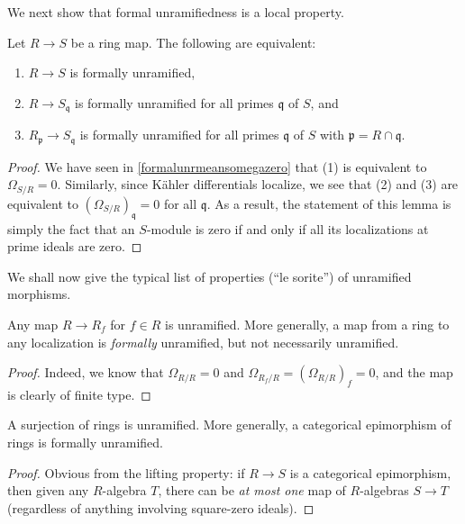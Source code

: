 We next show that formal unramifiedness is a local property.
\begin{lemma}
\label{lemma-formally-unramified-local}
Let $R \to S$ be a ring map.
The following are equivalent:
\begin{enumerate}
\item $R \to S$ is formally unramified,
\item $R \to S_{\mathfrak q}$ is formally unramified for all
primes $\mathfrak q$ of $S$, and
\item $R_{\mathfrak p} \to S_{\mathfrak q}$ is formally unramified
for all primes $\mathfrak q$ of $S$ with $\mathfrak p = R \cap \mathfrak q$.
\end{enumerate}
\end{lemma}

\begin{proof}
We have seen in
\cref{formalunrmeansomegazero}
that (1) is equivalent to
$\Omega_{S/R} = 0$. Similarly, since K\"ahler differentials localize, we see that (2) and (3)
are equivalent to $(\Omega_{S/R})_{\mathfrak q} = 0$ for all
$\mathfrak q$. 
As a result, the statement of this lemma is simply the fact that an $S$-module
is zero if and only if all its localizations at prime ideals are zero. 
\end{proof}

We shall now give the typical list of properties (``le sorite'') of unramified morphisms.

\begin{proposition} \label{locunramified}
Any map $R \to R_f$ for $f \in  R$ is unramified.
More generally, a map from a ring to any localization is \emph{formally}
unramified, but not necessarily unramified. 
\end{proposition} 
\begin{proof} 
Indeed, we know that $\Omega_{R/R}  = 0$ and $\Omega_{R_f/R } =
(\Omega_{R/R})_f=0$, and the map is clearly of finite type.
\end{proof} 

\begin{proposition} \label{epiunr}
A surjection of rings is unramified.
More generally, a categorical epimorphism of rings is formally unramified.
\end{proposition} 
\begin{proof} 
Obvious from the lifting property: if $R \to S$ is a categorical epimorphism,
then given any $R$-algebra $T$, there can be \emph{at most one} map of
$R$-algebras $S \to T$ (regardless of anything involving square-zero ideals).
\end{proof} 

